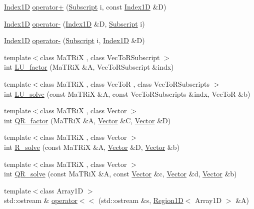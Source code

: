\begin{DoxyCompactItemize}
\hyperlink{class_t_n_t_1_1_index1_d}{Index1D} \hyperlink{namespace_t_n_t_a5d1dba378abe4e8fbf5764b1b79356cf}{operator+} (\hyperlink{namespace_t_n_t_af22e3f1460e145c04ce4e7d701e4c1c1}{Subscript} i, const \hyperlink{class_t_n_t_1_1_index1_d}{Index1D} \&D)
\item 
\hyperlink{class_t_n_t_1_1_index1_d}{Index1D} \hyperlink{namespace_t_n_t_ac0c985521e0128a6ee01e282490d7375}{operator-\/} (\hyperlink{class_t_n_t_1_1_index1_d}{Index1D} \&D, \hyperlink{namespace_t_n_t_af22e3f1460e145c04ce4e7d701e4c1c1}{Subscript} i)
\item 
\hyperlink{class_t_n_t_1_1_index1_d}{Index1D} \hyperlink{namespace_t_n_t_a02c702b71bdddc79a5bfb509a57ae62a}{operator-\/} (\hyperlink{namespace_t_n_t_af22e3f1460e145c04ce4e7d701e4c1c1}{Subscript} i, \hyperlink{class_t_n_t_1_1_index1_d}{Index1D} \&D)
\item 
{\footnotesize template$<$class MaTRiX , class VecToRSubscript $>$ }\\int \hyperlink{namespace_t_n_t_a61af2605f9847ba7a3132156e6702b6f}{LU\_\-factor} (MaTRiX \&A, VecToRSubscript \&indx)
\item 
{\footnotesize template$<$class MaTRiX , class VecToR , class VecToRSubscripts $>$ }\\int \hyperlink{namespace_t_n_t_a99e5258acbf1155d0d1fb9d326282e98}{LU\_\-solve} (const MaTRiX \&A, const VecToRSubscripts \&indx, VecToR \&b)
\item 
{\footnotesize template$<$class MaTRiX , class Vector $>$ }\\int \hyperlink{namespace_t_n_t_a995497fca15c0b39cf007994df2653fc}{QR\_\-factor} (MaTRiX \&A, \hyperlink{class_t_n_t_1_1_vector}{Vector} \&C, \hyperlink{class_t_n_t_1_1_vector}{Vector} \&D)
\item 
{\footnotesize template$<$class MaTRiX , class Vector $>$ }\\int \hyperlink{namespace_t_n_t_a4b8d4de03fba47c599760d2c670e1a84}{R\_\-solve} (const MaTRiX \&A, \hyperlink{class_t_n_t_1_1_vector}{Vector} \&D, \hyperlink{class_t_n_t_1_1_vector}{Vector} \&b)
\item 
{\footnotesize template$<$class MaTRiX , class Vector $>$ }\\int \hyperlink{namespace_t_n_t_aa769237a9cdf68476f149d633cd0bc52}{QR\_\-solve} (const MaTRiX \&A, const \hyperlink{class_t_n_t_1_1_vector}{Vector} \&c, \hyperlink{class_t_n_t_1_1_vector}{Vector} \&d, \hyperlink{class_t_n_t_1_1_vector}{Vector} \&b)
\item 
{\footnotesize template$<$class Array1D $>$ }\\std::ostream \& \hyperlink{namespace_t_n_t_a9d4a420b4c7846df31034b30ba145b47}{operator$<$$<$} (std::ostream \&s, \hyperlink{class_t_n_t_1_1_region1_d}{Region1D}$<$ Array1D $>$ \&A)

\end{DoxyCompactItemize}
